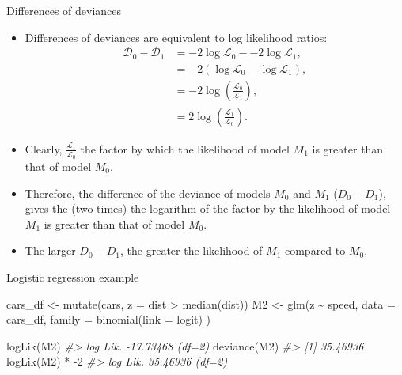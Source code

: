 \documentclass[
  10pt,
  ignorenonframetext,
]{beamer}
\newenvironment{Shaded}{\begin{snugshade}}{\end{snugshade}}
\newcommand{\AttributeTok}[1]{\textcolor[rgb]{0.77,0.63,0.00}{#1}}
\newcommand{\CommentTok}[1]{\textcolor[rgb]{0.56,0.35,0.01}{\textit{#1}}}
\newcommand{\DecValTok}[1]{\textcolor[rgb]{0.00,0.00,0.81}{#1}}
\newcommand{\FunctionTok}[1]{\textcolor[rgb]{0.00,0.00,0.00}{#1}}
\newcommand{\NormalTok}[1]{#1}
\newcommand{\OtherTok}[1]{\textcolor[rgb]{0.56,0.35,0.01}{#1}}
\newcommand{\SpecialCharTok}[1]{\textcolor[rgb]{0.00,0.00,0.00}{#1}}
\newcommand{\StringTok}[1]{\textcolor[rgb]{0.31,0.60,0.02}{#1}}
\begin{document}
\begin{frame}{Differences of deviances}
\protect\hypertarget{differences-of-deviances}{}
\begin{itemize}
\item
  Differences of deviances are equivalent to log likelihood ratios: \[
  \begin{aligned}
  \mathcal{D}_0 - \mathcal{D}_1 &= -2 \log\mathcal{L}_{0} -  -2 \log\mathcal{L}_{1},\\
                              &= -2 \left(\log\mathcal{L}_{0} -  \log\mathcal{L}_{1}\right),\\
                              &= -2 \log\left(\frac{\mathcal{L}_{0}}{\mathcal{L}_{1}}\right),\\
                              &= 2 \log\left(\frac{\mathcal{L}_{1}}{\mathcal{L}_{0}}\right).
  \end{aligned}
  \]
\item
  Clearly, \(\frac{\mathcal{L}_{1}}{\mathcal{L}_{0}}\) the factor by
  which the likelihood of model \(M_1\) is greater than that of model
  \(M_0\).
\item
  Therefore, the difference of the deviance of models \(M_0\) and
  \(M_1\) (\(D_0 - D_1\)), gives the (two times) the logarithm of the
  factor by the likelihood of model \(M_1\) is greater than that of
  model \(M_0\).
\item
  The larger \(D_0 - D_1\), the greater the likelihood of \(M_1\)
  compared to \(M_0\).
\end{itemize}
\end{frame}

\begin{frame}[fragile]{Logistic regression example}
\protect\hypertarget{logistic-regression-example}{}
\begin{Shaded}
\begin{Highlighting}[]
\NormalTok{cars\_df }\OtherTok{\textless{}{-}} \FunctionTok{mutate}\NormalTok{(cars, }\AttributeTok{z =}\NormalTok{ dist }\SpecialCharTok{\textgreater{}} \FunctionTok{median}\NormalTok{(dist))}
\NormalTok{M2 }\OtherTok{\textless{}{-}} \FunctionTok{glm}\NormalTok{(z }\SpecialCharTok{\textasciitilde{}}\NormalTok{ speed,}
          \AttributeTok{data =}\NormalTok{ cars\_df, }
          \AttributeTok{family =} \FunctionTok{binomial}\NormalTok{(}\AttributeTok{link =} \StringTok{\textquotesingle{}logit\textquotesingle{}}\NormalTok{)}
\NormalTok{)}

\FunctionTok{logLik}\NormalTok{(M2)}
\CommentTok{\#\textgreater{} \textquotesingle{}log Lik.\textquotesingle{} {-}17.73468 (df=2)}
\FunctionTok{deviance}\NormalTok{(M2)}
\CommentTok{\#\textgreater{} [1] 35.46936}
\FunctionTok{logLik}\NormalTok{(M2) }\SpecialCharTok{*} \SpecialCharTok{{-}}\DecValTok{2}
\CommentTok{\#\textgreater{} \textquotesingle{}log Lik.\textquotesingle{} 35.46936 (df=2)}
\end{Highlighting}
\end{Shaded}
\end{frame}
\end{document}
